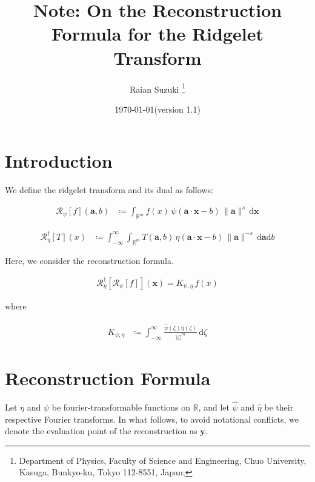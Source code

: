 \documentclass[a4paper,12pt]{article}
\newcommand{\intinf}{\int_{-\infty}^{\infty}}
\newcommand{\intrm}{\int_{\mathbb{R}^m}}
\newcommand{\R}{\mathbb{R}}
\newcommand{\Rid}{\mathscr{R}}
\newcommand{\Ridd}{\mathscr{R}^{\dagger}}
\newcommand{\z}{\zeta}
\newcommand{\va}{\bm{a}}
\newcommand{\vx}{\bm{x}}
\newcommand{\vy}{\bm{y}}
\newcommand{\nora}{\|\bm{a}\|}
\newcommand{\absz}{|\z|}
\newcommand{\da}{\mathrm{d}\va}
\newcommand{\dx}{\mathrm{d}\vx}
\newcommand{\db}{\mathrm{d}b}
\newcommand{\dd}{\mathrm{d}}
\newcommand{\psihat}{\widehat{\psi}}
\newcommand{\etahat}{\widehat{\eta}}
\begin{document}
\title{
\bf 
Note: On the Reconstruction Formula for the Ridgelet Transform
}
\author{
Raian Suzuki
\footnote{
Department of Physics,
Faculty of Science and Engineering,
Chuo University, 
Kasuga, Bunkyo-ku, Tokyo 112-8551, Japan;
} 
}

\date{\today (version 1.1)}

\pagestyle{plain}
\maketitle

  

\clearpage

\section{Introduction}

We define the ridgelet transform and its dual as follows:

\begin{align}
  \Rid_\psi[f](\va, b) &\coloneqq \intrm f(x) \, \psi(\va \cdot \vx - b) \, \nora^s \, \dx
\end{align}

\begin{align}
  \Ridd_{\eta}[T](x) &\coloneqq \intinf \intrm  T(\va, b) \, \eta(\va \cdot \vx - b) \, \nora^{-s}\, \da \db
\end{align}

Here, we consider the reconstruction formula.

\begin{align}
  \Ridd_{\eta}[\Rid_\psi[f]](\vx) = K_{\psi, \eta} \, f(x)
\end{align}

where 

\begin{align}
  K_{\psi, \eta} &\coloneqq \intinf \frac{\overline{\psihat(\z)}\etahat(\z)}{\absz^{m}} \, \dd \z
\end{align}

\clearpage

\section{Reconstruction Formula}

Let $\eta$ and $\psi$ be fourier-transformable functions on $\R$, and let $\psihat$ and $\etahat$ be their respective Fourier transforms.
In what follows, to avoid notational conflicts, we denote the evaluation point of the reconstruction as $\vy$.
\end{document}
